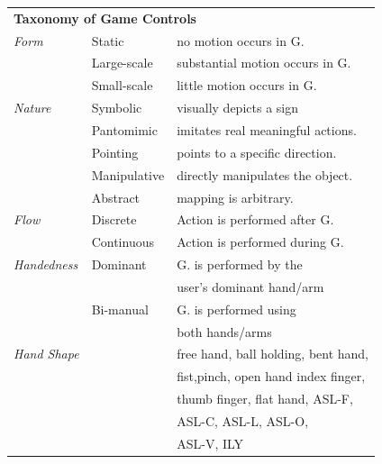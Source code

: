 \documentclass{sigchi}
\newcommand\tabhead[1]{\small\textbf{#1}}
\begin{document}
\begin{table}
  \centering
  \begin{adjustwidth}{-0.4cm}{}
  \begin{tabular}{|l|l|l|}
    \hline
    \multicolumn{3}{|p{1.06\columnwidth}|}{\centering\tabhead{\textbf{Taxonomy of Game Controls}}}\\
    \Xhline{4\arrayrulewidth}
    \em{Form} &Static& no motion occurs in G.\\ \cline{2-3}
    &Large-scale& substantial motion occurs in G. \\ \cline{2-3}
    &Small-scale& little motion occurs in G.\\
    \Xhline{4\arrayrulewidth}
    \em{Nature} & Symbolic &visually depicts a sign \\ \cline{2-3}
    &Pantomimic&imitates real meaningful actions.\\ \cline{2-3}
    &Pointing&points to a specific direction.\\ \cline{2-3}
    &Manipulative&directly manipulates the object.\\ \cline{2-3}
    &Abstract&mapping is arbitrary.\\
    \Xhline{4\arrayrulewidth}
    \em{Flow} & Discrete&Action is performed after G.\\ \cline{2-3}
    &Continuous&Action is performed during G.\\ 
    \Xhline{4\arrayrulewidth}
    \em{Handedness} & Dominant & G. is performed by the \\&&user's dominant hand/arm \\ \cline{2-3}
    &Bi-manual&G. is performed using \\&&both hands/arms\\
    \Xhline{4\arrayrulewidth}
    \em{Hand Shape} &&free hand, ball holding, bent hand,\\&& fist,pinch, open hand
    index finger,\\&&thumb finger, flat hand, ASL-F,\\&&ASL-C, ASL-L, ASL-O, \\&&ASL-V, ILY\\

\end{tabular}
\end{adjustwidth}
\end{table}
\end{document}
